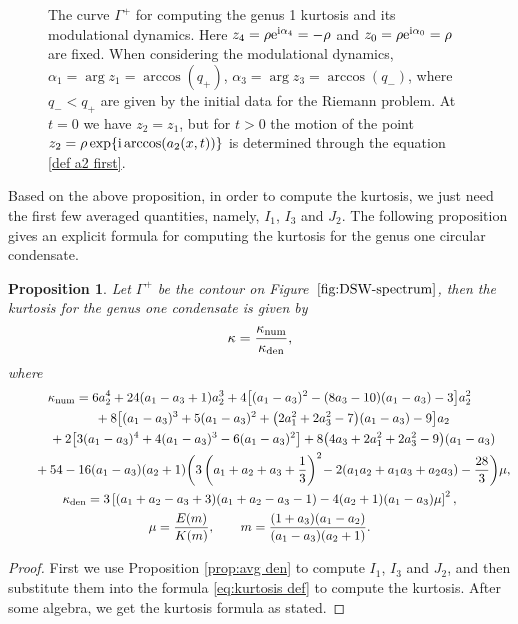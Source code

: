 \documentclass[10pt,a4paper]{amsart}
\numberwithin{equation}{section}
\newtheorem{Proposition}[Theorem]{Proposition}
\newcommand{\G}{\Gamma}
\def\G{\Gamma}
\begin{document}
\begin{figure}
{\begin{tikzpicture}[x=0.75pt,y=0.75pt,yscale=-1,xscale=1]
	
\end{tikzpicture}

   }
    \caption{The curve $\G^+$ for computing the genus 1 kurtosis and its modulational dynamics. Here $z_4=\rho {\rm e}^{{\rm i}\alpha_4}=-\rho$ and $z_0=\rho {\rm e}^{{\rm i}\alpha_0}=\rho$ are fixed. When considering the modulational dynamics, $\alpha_1=\arg z_1=\arccos(q_+)$, $\alpha_3=\arg z_3=\arccos(q_-)$, where $q_-<q_+$ are given by the initial data for the Riemann problem.  At $t=0$  we have $z_2=z_1$, but for $t>0$  the motion of the point $z_2=\rho\exp\{{\rm i}\arccos(a_2(x,t))\}$ is determined through the equation \eqref{def a2 first}.}
    \label{fig:DSW-spectrum}
\end{figure}


Based on the above proposition, in order to compute the kurtosis, we just need the first few averaged quantities, namely, $I_1$, $I_3$ and $J_2$. The following proposition gives an explicit formula for computing the kurtosis for the genus one circular condensate.

\begin{Proposition}\label{prop:g1 kur}
Let $\G^+$ be the contour on Figure~$\ref{fig:DSW-spectrum}$, then the kurtosis for the genus one condensate is given by
\begin{align}
\kappa=\frac{\kappa_{\rm num}}{\kappa_{\rm den}}, \label{eq:g1-kurtosis}
\end{align}
where
\begin{gather*}
\kappa_{\rm num}=6a_2^4+24(a_1-a_3+1)a_2^3+4\bigl[(a_1-a_3)^2-(8a_3-10)(a_1-a_3)-3\bigr]a_2^2\\ \qquad{}
+8\bigl[(a_1-a_3)^3+5(a_1-a_3)^2+\bigl(2a_1^2+2a_3^2-7\bigr)(a_1-a_3)-9\bigr]a_2\\ \qquad{}
+2\bigl[3(a_1-a_3)^4+4(a_1-a_3)^3-6(a_1-a_3)^2\bigr]+8\bigl(4a_3+2a_1^2+2a_3^2-9\bigr)(a_1-a_3)\\ \qquad{}
+54-16(a_1-a_3)(a_2+1)\biggl(3\left(a_1+a_2+a_3+\frac{1}{3}\right)^2\!-2(a_1a_2+a_1a_3+a_2a_3)-\frac{28}{3}\biggr)\mu,\\
\kappa_{\rm den}=3\left[(a_1+a_2-a_3+3)(a_1+a_2-a_3-1)-4(a_2+1)(a_1-a_3)\mu\right]^2,\\
\mu=\frac{E(m)}{K(m)},\qquad m=\frac{(1+a_3)(a_1-a_2)}{(a_1-a_3)(a_2+1)}.
\end{gather*}
\end{Proposition}

\begin{proof}
First we use Proposition \ref{prop:avg den} to compute $I_1$, $I_3$ and $J_2$, and then substitute them into the formula \eqref{eq:kurtosis def} to compute the kurtosis. After some algebra, we get the kurtosis formula as stated.
\end{proof}
\end{document}
